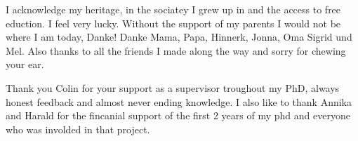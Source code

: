 I acknowledge my heritage, in the sociatey I grew up in and the access to free eduction.
I feel very lucky.
Without the support of my parents I would not be where I am today, Danke!
Danke Mama, Papa, Hinnerk, Jonna, Oma Sigrid und Mel.
Also thanks to all the friends I made along the way and sorry for chewing your ear.


Thank you Colin for your support as a supervisor troughout my PhD, always honest feedback and almost never ending knowledge.
I also like to thank Annika and Harald for the fincanial support of the first 2 years of my phd and everyone who was involded in that project.
%
%
%
%
%
